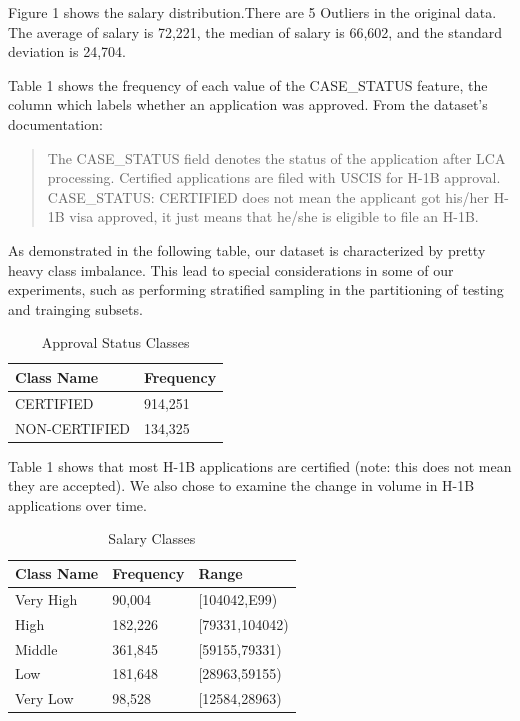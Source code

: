 \documentclass[sigconf]{acmart}
\begin{document}
Figure 1 shows the salary distribution.There are 5 Outliers in the original data. The average of
salary is 72,221, the median of salary is 66,602, and the standard deviation is 24,704.

Table 1 shows the frequency of each value of the CASE\_STATUS feature, the column which labels
whether an application was approved. From the dataset's documentation:

\begin{quote}
The CASE\_STATUS field denotes the status of the application after LCA processing. Certified
    applications are filed with USCIS for H-1B approval. CASE\_STATUS: CERTIFIED does not mean the
    applicant got his/her H-1B visa approved, it just means that he/she is eligible to file an H-1B.
\end{quote}

As demonstrated in the following table, our dataset is characterized by pretty heavy class
imbalance. This lead to special considerations in some of our experiments, such as performing
stratified sampling in the partitioning of testing and trainging subsets.

\begin{table}[h]
	\caption{Approval Status Classes}
    \begin{tabular}{l l}
        Class Name &Frequency \\
        \hline
        CERTIFIED&914,251 \\
        NON-CERTIFIED&134,325
    \end{tabular}
\end{table}

Table 1 shows that most H-1B applications are certified (note: this does not mean they are
accepted). We also chose to examine the change in volume in H-1B applications over time.

\begin{table}[h]
	\caption{Salary Classes}
    \begin{tabular}{l l l}
        Class Name&Frequency&Range \\
        \hline
        Very High& 90,004   & [104042,E99)\\
        High     & 182,226  & [79331,104042)\\
        Middle   & 361,845  & [59155,79331)\\
        Low      & 181,648  & [28963,59155)\\
        Very Low & 98,528   & [12584,28963)\\
    \end{tabular}
\end{table}
\end{document}
